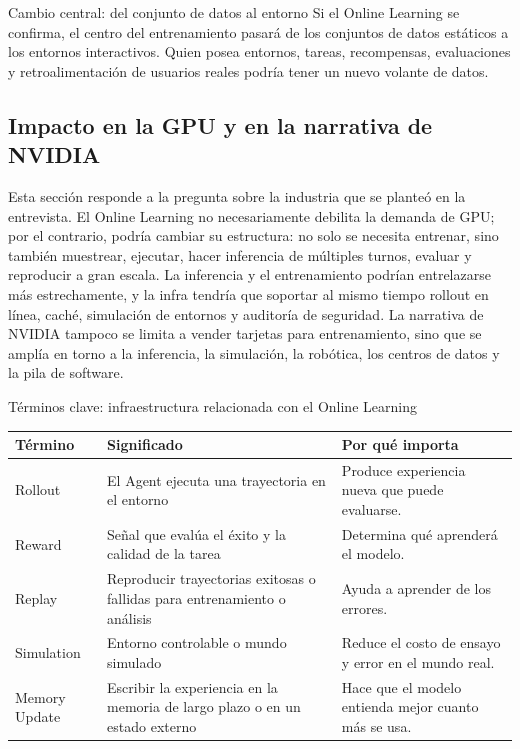 \documentclass[a4paper]{article}
\begin{document}
\begin{importantbox}{Cambio central: del conjunto de datos al entorno}
Si el Online Learning se confirma, el centro del entrenamiento pasará de los conjuntos de datos estáticos a los entornos interactivos. Quien posea entornos, tareas, recompensas, evaluaciones y retroalimentación de usuarios reales podría tener un nuevo volante de datos.
\end{importantbox}

\subsection{Impacto en la GPU y en la narrativa de NVIDIA}

Esta sección responde a la pregunta sobre la industria que se planteó en la entrevista. El Online Learning no necesariamente debilita la demanda de GPU; por el contrario, podría cambiar su estructura: no solo se necesita entrenar, sino también muestrear, ejecutar, hacer inferencia de múltiples turnos, evaluar y reproducir a gran escala. La inferencia y el entrenamiento podrían entrelazarse más estrechamente, y la infra tendría que soportar al mismo tiempo rollout en línea, caché, simulación de entornos y auditoría de seguridad. La narrativa de NVIDIA tampoco se limita a vender tarjetas para entrenamiento, sino que se amplía en torno a la inferencia, la simulación, la robótica, los centros de datos y la pila de software.

\begin{knowledgebox}{Términos clave: infraestructura relacionada con el Online Learning}
\noindent\begin{tabularx}{\textwidth}{p{}p{}X}
\toprule
Término & Significado & Por qué importa \\
\midrule
Rollout & El Agent ejecuta una trayectoria en el entorno & Produce experiencia nueva que puede evaluarse. \\
Reward & Señal que evalúa el éxito y la calidad de la tarea & Determina qué aprenderá el modelo. \\
Replay & Reproducir trayectorias exitosas o fallidas para entrenamiento o análisis & Ayuda a aprender de los errores. \\
Simulation & Entorno controlable o mundo simulado & Reduce el costo de ensayo y error en el mundo real. \\
Memory Update & Escribir la experiencia en la memoria de largo plazo o en un estado externo & Hace que el modelo entienda mejor cuanto más se usa. \\
\bottomrule
\end{tabularx}
\end{knowledgebox}
\end{document}
